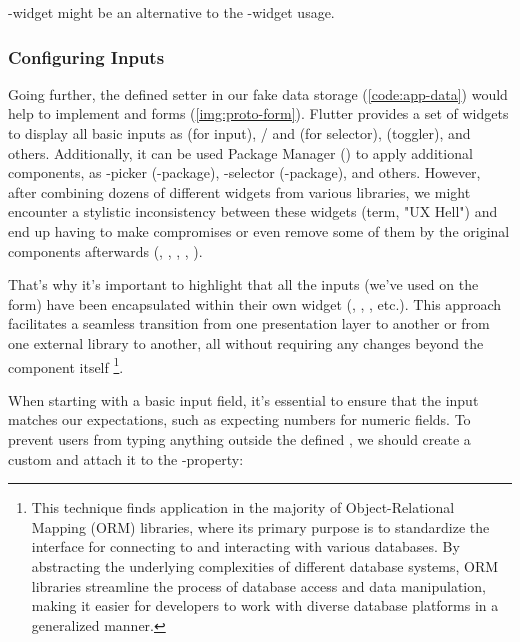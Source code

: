 \noindent {}-widget might be an alternative to the -widget usage.


\subsubsection{Configuring Inputs}

Going further, the defined setter in our fake data storage (\cref{code:app-data}) would help to implement 
 and  forms  (\cref{img:proto-form}). Flutter provides a set of widgets to display all 
basic inputs as  (for input),  /  and  (for 
selector),  (toggler), and others. Additionally, it can be used Package Manager () to apply additional
components, as -picker (-package), -selector (-package),
and others. However, after combining dozens of different widgets from various libraries, we might encounter a stylistic 
inconsistency between these widgets (term, "UX Hell") and end up having to make compromises or even remove some of them
by the original components afterwards (, , , , ).

That's why it's important to highlight that all the inputs (we've used on the form) have been encapsulated within 
their own widget (, , , etc.). This approach facilitates a seamless 
transition from one presentation layer to another or from one external library to another, all without requiring any 
changes beyond the component itself \footnote{This technique finds application in the majority of Object-Relational 
Mapping (ORM) libraries, where its primary purpose is to standardize the interface for connecting to and interacting 
with various databases. By abstracting the underlying complexities of different database systems, ORM libraries 
streamline the process of database access and data manipulation, making it easier for developers to work with diverse 
database platforms in a generalized manner.}.

When starting with a basic input field, it's essential to ensure that the input matches our expectations, such as 
expecting numbers for numeric fields. To prevent users from typing anything outside the defined , 
we should create a custom  and attach it to the -property:

